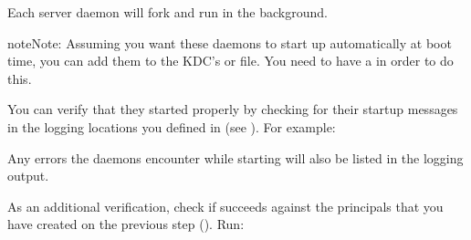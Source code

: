 \documentclass[letterpaper,10pt,english]{sphinxmanual}
\begin{document}
Each server daemon will fork and run in the background.

\begin{sphinxadmonition}{note}{Note:}
Assuming you want these daemons to start up automatically at
boot time, you can add them to the KDC’s  or
 file.  You need to have a
 in order to do this.
\end{sphinxadmonition}

You can verify that they started properly by checking for their
startup messages in the logging locations you defined in
{\hyperref[\detokenize{admin/conf_files/krb5_conf:krb5-conf-5}]{}} (see {\hyperref[\detokenize{admin/conf_files/kdc_conf:logging}]{}}).  For example:

%
\begin{sphinxVerbatim}[commandchars=\\\{\}]
  
    \PYG{p}{[}\PYG{p}{]}  
  
    \PYG{p}{[}\PYG{p}{]} 
\end{sphinxVerbatim}

Any errors the daemons encounter while starting will also be listed in
the logging output.

As an additional verification, check if  succeeds
against the principals that you have created on the previous step
({\hyperref[\detokenize{admin/install_kdc:addadmin-kdb}]{}}).  Run:

%
\begin{sphinxVerbatim}[commandchars=\\\{\}]
  
\end{sphinxVerbatim}
\end{document}
